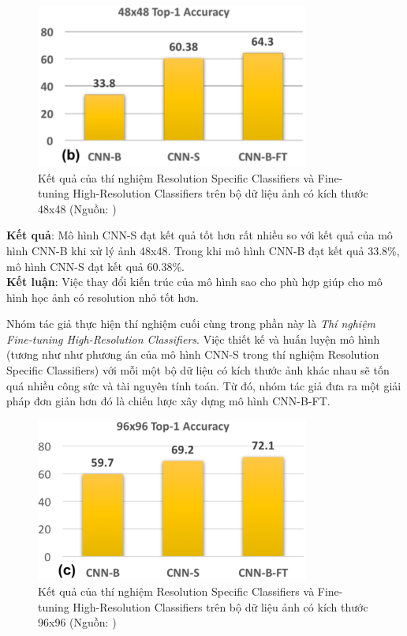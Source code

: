 {    \begin{figure}[H]
        \centering
        \includegraphics[width=9cm] {images/snip_res_spec_cls}
        \caption{Kết quả của thí nghiệm Resolution Specific Classifiers và Fine-tuning High-Resolution Classifiers trên bộ dữ liệu ảnh có kích thước 48x48 (Nguồn: \cite{singh2018analysis})}
        \label{fig:snip_res_spec_cls}
    \end{figure}

    \noindent
    \textbf{Kết quả}:
    Mô hình CNN-S đạt kết quả tốt hơn rất nhiều so với kết quả của mô hình CNN-B khi xử lý ảnh 48x48.
    Trong khi mô hình CNN-B đạt kết quả 33.8\%, mô hình CNN-S đạt kết quả 60.38\%. \\
    \textbf{Kết luận}:
    Việc thay đổi kiến trúc của mô hình sao cho phù hợp giúp cho mô hình học ảnh có resolution nhỏ tốt hơn.

    \noindent
    Nhóm tác giả thực hiện thí nghiệm cuối cùng trong phần này là \textit{Thí nghiệm Fine-tuning High-Resolution Classifiers}.
    Việc thiết kế và huấn luyện mô hình (tương như như phương án của mô hình CNN-S trong thí nghiệm Resolution Specific Classifiers) với mỗi một bộ dữ liệu có kích thước ảnh khác nhau sẽ tốn quá nhiều công sức và tài nguyên tính toán.
    Từ đó, nhóm tác giả đưa ra một giải pháp đơn giản hơn đó là chiến lược xây dựng mô hình CNN-B-FT.

    \begin{figure}[H]
        \centering
        \includegraphics[width=9cm] {images/snip_res_spec_cls_96}
        \caption{Kết quả của thí nghiệm Resolution Specific Classifiers và Fine-tuning High-Resolution Classifiers trên bộ dữ liệu ảnh có kích thước 96x96 (Nguồn: \cite{singh2018analysis})}
        \label{fig:snip_res_spec_cls_96}
    \end{figure}

}
